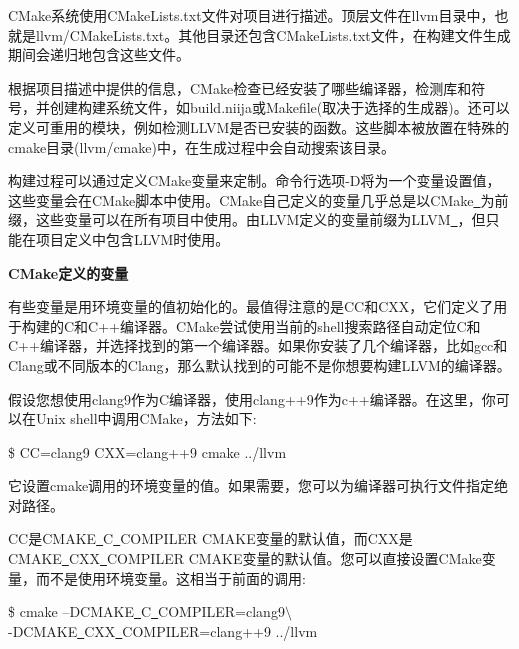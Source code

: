 CMake系统使用CMakeLists.txt文件对项目进行描述。顶层文件在llvm目录中，也就是llvm/CMakeLists.txt。其他目录还包含CMakeLists.txt文件，在构建文件生成期间会递归地包含这些文件。\par

根据项目描述中提供的信息，CMake检查已经安装了哪些编译器，检测库和符号，并创建构建系统文件，如build.niija或Makefile(取决于选择的生成器)。还可以定义可重用的模块，例如检测LLVM是否已安装的函数。这些脚本被放置在特殊的cmake目录(llvm/cmake)中，在生成过程中会自动搜索该目录。\par

构建过程可以通过定义CMake变量来定制。命令行选项-D将为一个变量设置值，这些变量会在CMake脚本中使用。CMake自己定义的变量几乎总是以CMake\underline{~}为前缀，这些变量可以在所有项目中使用。由LLVM定义的变量前缀为LLVM\underline{~}，但只能在项目定义中包含LLVM时使用。\par

\hspace*{\fill} \par %
\textbf{CMake定义的变量}

有些变量是用环境变量的值初始化的。最值得注意的是CC和CXX，它们定义了用于构建的C和C++编译器。CMake尝试使用当前的shell搜索路径自动定位C和C++编译器，并选择找到的第一个编译器。如果你安装了几个编译器，比如gcc和Clang或不同版本的Clang，那么默认找到的可能不是你想要构建LLVM的编译器。\par

假设您想使用clang9作为C编译器，使用clang++9作为c++编译器。在这里，你可以在Unix shell中调用CMake，方法如下:\par

\begin{tcolorbox}[colback=white,colframe=black]
	\$ CC=clang9 CXX=clang++9 cmake ../llvm
\end{tcolorbox}

它设置cmake调用的环境变量的值。如果需要，您可以为编译器可执行文件指定绝对路径。\par

CC是CMAKE\underline{~}C\underline{~}COMPILER CMAKE变量的默认值，而CXX是CMAKE\underline{~}CXX\underline{~}COMPILER CMAKE变量的默认值。您可以直接设置CMake变量，而不是使用环境变量。这相当于前面的调用:\par

\begin{tcolorbox}[colback=white,colframe=black]
	\$ cmake –DCMAKE\underline{~}C\underline{~}COMPILER=clang9$\setminus$\\
	\hspace*{1cm}-DCMAKE\underline{~}CXX\underline{~}COMPILER=clang++9 ../llvm
\end{tcolorbox}

